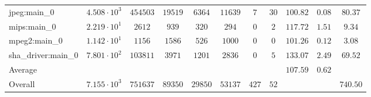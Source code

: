 \begin{tabular}{|l|c|c|c|c|c|c|c|c|c|c|}
jpeg:main\_0            & $ 4.508 \cdot 10^{3}  $ & $ 454503 $ & $ 19519 $ & $ 6364  $ & $ 11639 $ & $ 7   $ & $ 30 $ & $ 100.82      $ & $ 0.08    $ & $ 80.37   $ \\
mips:main\_0            & $ 2.219 \cdot 10^{1}  $ & $ 2612   $ & $ 939   $ & $ 320   $ & $ 294   $ & $ 0   $ & $ 2  $ & $ 117.72      $ & $ 1.51    $ & $ 9.34    $ \\
mpeg2:main\_0           & $ 1.142 \cdot 10^{1}  $ & $ 1156   $ & $ 1586  $ & $ 526   $ & $ 1000  $ & $ 0   $ & $ 0  $ & $ 101.26      $ & $ 0.12    $ & $ 3.08    $ \\
sha\_driver:main\_0     & $ 7.801 \cdot 10^{2}  $ & $ 103811 $ & $ 3971  $ & $ 1201  $ & $ 2836  $ & $ 0   $ & $ 5  $ & $ 133.07      $ & $ 2.49    $ & $ 69.52   $ \\
\hline
Average                 & $                     $ & $        $ & $       $ & $       $ & $       $ & $     $ & $    $ & $ 107.59      $ & $ 0.62    $ & $         $ \\
\hline
Overall                 & $ 7.155 \cdot 10^{3}  $ & $ 751637 $ & $ 89350 $ & $ 29850 $ & $ 53137 $ & $ 427 $ & $ 52 $ & $             $ & $         $ & $ 740.50  $ \\
\hline
\end{tabular}
